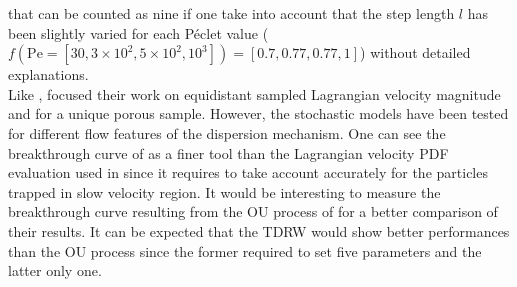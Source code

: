 that can be counted as nine if one take into account that the step length $l$ has been slightly varied for each Péclet value ($f(\mathrm{Pe}=[30, 3\times 10^2, 5\times 10^2, 10^3])=[0.7,0.77,0.77,1]$) without detailed explanations.\\
Like \citeauthor{Puyguiraud2019}, \citeauthor{Dentz2017} focused their work on equidistant sampled Lagrangian velocity magnitude and for a unique porous sample. However, the stochastic models have been tested for different flow features of the dispersion mechanism. 
One can see the breakthrough curve of \citeauthor{Dentz2017} as a finer tool than the Lagrangian velocity PDF evaluation used in \citeauthor{Puyguiraud2019} since it requires to take account accurately for the particles trapped in slow velocity region.
It would be interesting to measure the breakthrough curve resulting from the OU process of \citet{Puyguiraud2019} for a better comparison  of their results.
It can be expected that the TDRW would show better performances than the OU process since the former required to set five parameters and the latter only one.

